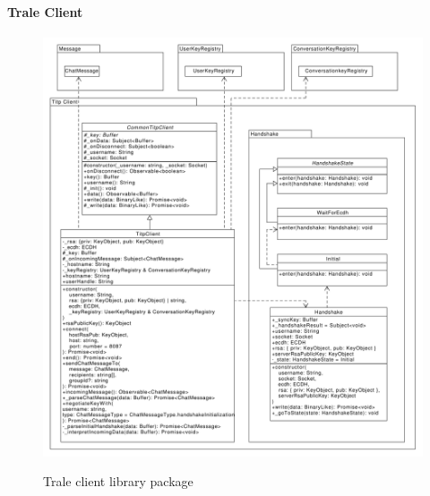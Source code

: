 \paragraph{Trale Client}





\begin{figure}[H]
    \centering
    \caption{Trale client library package}
    \hspace*{-2.9cm}
    \includegraphics[width=1.3\textwidth]{./graphics/classDiagramTransportLibrary-TitpClient}
    \label{fig:figure37}
\end{figure}

